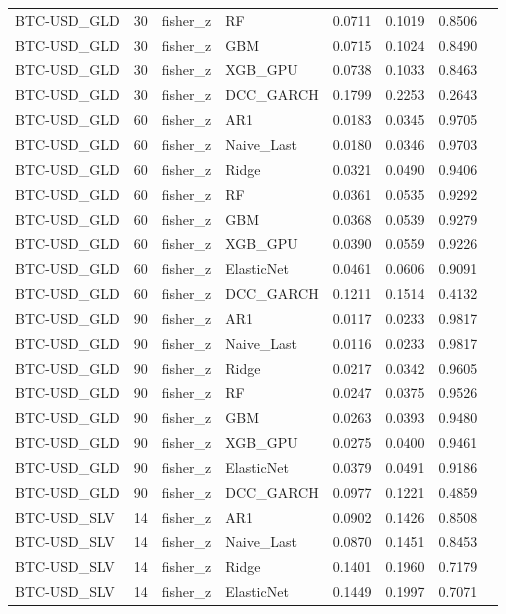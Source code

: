 \begin{table}[H]
\begin{tabular}{llllrrrr}
BTC-USD_GLD & 30 & fisher_z & RF & 0.0711 & 0.1019 & 0.8506 &  \\
BTC-USD_GLD & 30 & fisher_z & GBM & 0.0715 & 0.1024 & 0.8490 &  \\
BTC-USD_GLD & 30 & fisher_z & XGB_GPU & 0.0738 & 0.1033 & 0.8463 &  \\
BTC-USD_GLD & 30 & fisher_z & DCC_GARCH & 0.1799 & 0.2253 & 0.2643 &  \\
BTC-USD_GLD & 60 & fisher_z & AR1 & 0.0183 & 0.0345 & 0.9705 &  \\
BTC-USD_GLD & 60 & fisher_z & Naive_Last & 0.0180 & 0.0346 & 0.9703 &  \\
BTC-USD_GLD & 60 & fisher_z & Ridge & 0.0321 & 0.0490 & 0.9406 &  \\
BTC-USD_GLD & 60 & fisher_z & RF & 0.0361 & 0.0535 & 0.9292 &  \\
BTC-USD_GLD & 60 & fisher_z & GBM & 0.0368 & 0.0539 & 0.9279 &  \\
BTC-USD_GLD & 60 & fisher_z & XGB_GPU & 0.0390 & 0.0559 & 0.9226 &  \\
BTC-USD_GLD & 60 & fisher_z & ElasticNet & 0.0461 & 0.0606 & 0.9091 &  \\
BTC-USD_GLD & 60 & fisher_z & DCC_GARCH & 0.1211 & 0.1514 & 0.4132 &  \\
BTC-USD_GLD & 90 & fisher_z & AR1 & 0.0117 & 0.0233 & 0.9817 &  \\
BTC-USD_GLD & 90 & fisher_z & Naive_Last & 0.0116 & 0.0233 & 0.9817 &  \\
BTC-USD_GLD & 90 & fisher_z & Ridge & 0.0217 & 0.0342 & 0.9605 &  \\
BTC-USD_GLD & 90 & fisher_z & RF & 0.0247 & 0.0375 & 0.9526 &  \\
BTC-USD_GLD & 90 & fisher_z & GBM & 0.0263 & 0.0393 & 0.9480 &  \\
BTC-USD_GLD & 90 & fisher_z & XGB_GPU & 0.0275 & 0.0400 & 0.9461 &  \\
BTC-USD_GLD & 90 & fisher_z & ElasticNet & 0.0379 & 0.0491 & 0.9186 &  \\
BTC-USD_GLD & 90 & fisher_z & DCC_GARCH & 0.0977 & 0.1221 & 0.4859 &  \\
BTC-USD_SLV & 14 & fisher_z & AR1 & 0.0902 & 0.1426 & 0.8508 &  \\
BTC-USD_SLV & 14 & fisher_z & Naive_Last & 0.0870 & 0.1451 & 0.8453 &  \\
BTC-USD_SLV & 14 & fisher_z & Ridge & 0.1401 & 0.1960 & 0.7179 &  \\
BTC-USD_SLV & 14 & fisher_z & ElasticNet & 0.1449 & 0.1997 & 0.7071 &  \\

\end{tabular}
\end{table}
